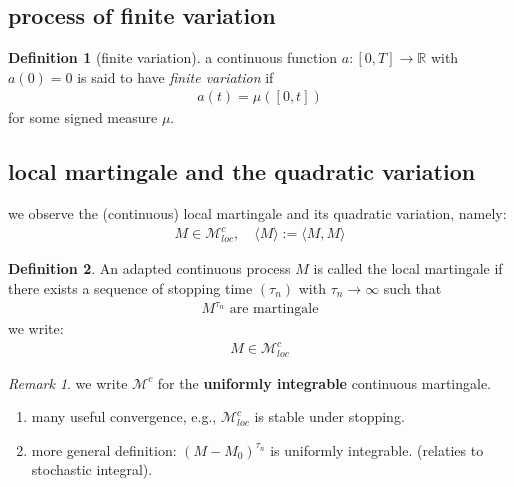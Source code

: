 \documentclass[a4paper,11pt]{book}
\theoremstyle{definition}
\newtheorem{definition}{Definition}[section]
\theoremstyle{remark}
\newtheorem*{remark}{Remark}
\begin{document}
\subsection{process of finite variation}
\begin{definition}[finite variation]
	a continuous function $a: [0, T] \rightarrow\mathbb{R}$ with $a(0) = 0$ is said to have \textit{finite variation} if 
	\begin{align*}
		a(t) = \mu([0, t])
	\end{align*}
	for some signed measure $\mu$. 
\end{definition}

\subsection{local martingale and the quadratic variation}

we observe the (continuous) local martingale and its quadratic variation, namely:
\begin{align*}
	M \in \mathcal{M}^c_{loc}, \quad \langle M \rangle := \langle M , M \rangle
\end{align*}

\begin{definition}
	An adapted continuous process $M$ is called the local martingale if there exists a sequence of stopping time $(\tau_n)$ with $\tau_n \rightarrow \infty$ such that
	\begin{align*}
		M^{\tau_n} \text{ are martingale}
	\end{align*}
	we write:
	\begin{align*}
		M \in \mathcal{M}_{loc}^c
	\end{align*}
\end{definition}
\begin{remark}
we write $\mathcal{M}^c$ for the \textbf{uniformly integrable} continuous martingale. 
\begin{enumerate}
	\item many useful convergence, e.g., $\mathcal{M}^c_{loc}$ is stable under stopping. 
	\item more general definition: $(M - M_0)^{\tau_n}$ is uniformly integrable. (relaties to stochastic integral). 
\end{enumerate}	
\end{remark}
\end{document}
